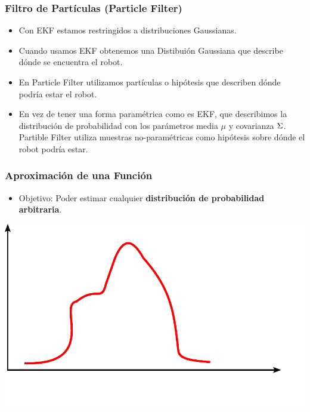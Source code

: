 \begin{frame}
    \frametitle{Filtro de Partículas (Particle Filter)}
    \footnotesize
    \begin{itemize}
        \item Con EKF estamos restringidos a distribuciones Gaussianas.
        \item Cuando usamos EKF obtenemos una Distibuión Gaussiana que describe dónde se encuentra el robot.
        \item En Particle Filter utilizamos partículas o hipótesis que describen dónde podría estar el robot.
        \item En vez de tener una forma paramétrica como es EKF, que describimos la distribución de probabilidad con los parámetros media $\mu$ y covarianza $\Sigma$. Partible Filter utiliza muestras no-paramétricas como hipótesis sobre dónde el robot podría estar.
    \end{itemize}
    
    
   	\begin{center}
    \end{center}
    
    
\end{frame}

\begin{frame}
    \frametitle{Aproximación de una Función}
    \footnotesize
    
    \begin{itemize}
        \item Objetivo: Poder estimar cualquier \textbf{distribución de probabilidad arbitraria}.
    \end{itemize}
    
    \begin{center}
    \includegraphics[width=0.5\columnwidth]{./images/particle_filter/arbitrary_distribution.pdf}
    \end{center}
    
\end{frame}

